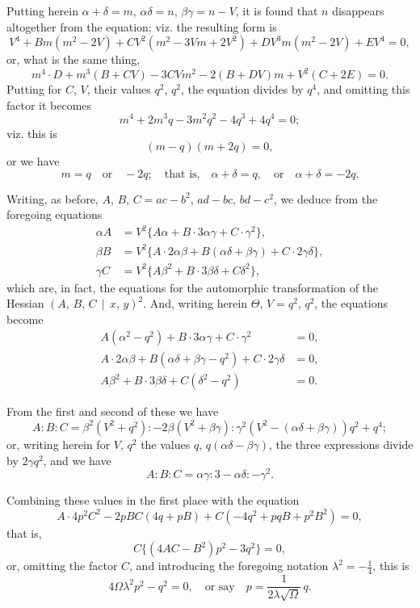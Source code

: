 \documentclass[11pt,a4paper]{book}
\begin{document}
Putting herein $\alpha + \delta = m$, $\alpha\delta = n$, $\beta\gamma = n - V$, it is found that $n$ disappears altogether from the equation; viz. the resulting form is
\[
V^{4} + Bm(m^{2} - 2V) + C V^{2}(m^{2} - 3Vm + 2V^{2}) + D V^{3}m(m^{2} - 2V) + E V^{4} = 0,
\]
or, what is the same thing,
\[
m^{4} \cdot D + m^{3}(B + CV) - 3CVm^{2} - 2(B + DV)m + V^{2}(C + 2E) = 0.
\]
Putting for $C$, $V$, their values $q^{2}$, $q^{2}$, the equation divides by $q^{4}$, and omitting this factor it becomes
\[
m^{4} + 2m^{3}q - 3m^{2}q^{2} - 4q^{3} + 4q^{4} = 0;
\]
viz. this is
\[
(m - q)(m + 2q) = 0,
\]
or we have
\[
m = q \quad\text{or}\quad -2q;\quad \text{that is,}\quad \alpha + \delta = q,\quad \text{or}\quad \alpha + \delta = -2q.
\]

Writing, as before, $A$, $B$, $C = ac - b^{2}$, $ad - bc$, $bd - c^{2}$, we deduce from the foregoing equations
\begin{align*}
\alpha A &= V^{2}\{A\alpha + B\cdot 3\alpha\gamma + C\cdot \gamma^{2}\},\\
\beta B &= V^{2}\{A\cdot 2\alpha\beta + B(\alpha\delta + \beta\gamma) + C\cdot 2\gamma\delta\},\\
\gamma C &= V^{2}\{A\beta^{2} + B\cdot 3\beta\delta + C\delta^{2}\},
\end{align*}
which are, in fact, the equations for the automorphic transformation of the Hessian $(A,\, B,\, C \,\!\!\mid\!\!\, x,\, y)^{2}$. And, writing herein $\Theta$, $V = q^{2}$, $q^{2}$, the equations become
\begin{align*}
A(\alpha^{2} - q^{2}) + B\cdot 3\alpha\gamma + C\cdot \gamma^{2} &= 0,\\
A\cdot 2\alpha\beta + B(\alpha\delta + \beta\gamma - q^{2}) + C\cdot 2\gamma\delta &= 0,\\
A\beta^{2} + B\cdot 3\beta\delta + C(\delta^{2} - q^{2}) &= 0.
\end{align*}

From the first and second of these we have
\[
A : B : C = \beta^{2}(V^{2} + q^{2}) : -2\beta(V^{2} + \beta\gamma) : \gamma^{2}(V^{2} - (\alpha\delta + \beta\gamma))q^{2} + q^{4};
\]
or, writing herein for $V$, $q^{2}$ the values $q$, $q(\alpha\delta - \beta\gamma)$, the three expressions divide by $2\gamma q^{2}$, and we have
\[
A : B : C = \alpha\gamma : 3 - \alpha\delta : -\gamma^{2}.
\]

Combining these values in the first place with the equation
\[
A\cdot 4p^{2}C^{2} - 2pBC(4q + pB) + C(-4q^{2} + pqB + p^{2}B^{2}) = 0,
\]
that is,
\[
C\{(4AC - B^{2})p^{2} - 3q^{2}\} = 0,
\]
or, omitting the factor $C$, and introducing the foregoing notation $\lambda^{2} = -\frac{1}{4}$, this is
\[
4\Omega\lambda^{2}p^{2} - q^{2} = 0,\quad \text{or say}\quad p = \frac{1}{2\lambda\sqrt{\Omega}}\,q.
\]
\end{document}
